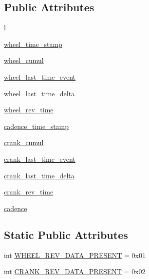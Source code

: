 \subsection*{Public Attributes}
\begin{DoxyCompactItemize}
\item 
\hyperlink{classble__sc_1_1CSC__Delegate_af237ae7177e1dba023617ab7c68f103a}{l}
\item 
\hyperlink{classble__sc_1_1CSC__Delegate_a4bd2c809d7123ec3b4d24510a7c29995}{wheel\+\_\+time\+\_\+stamp}
\item 
\hyperlink{classble__sc_1_1CSC__Delegate_a6cf7441d1a9f64d4589f264969dbba31}{wheel\+\_\+cumul}
\item 
\hyperlink{classble__sc_1_1CSC__Delegate_ab3d37c1828f03c4deb67a42294576718}{wheel\+\_\+last\+\_\+time\+\_\+event}
\item 
\hyperlink{classble__sc_1_1CSC__Delegate_ab0615eadb968070c25825660225c8230}{wheel\+\_\+last\+\_\+time\+\_\+delta}
\item 
\hyperlink{classble__sc_1_1CSC__Delegate_a9dbf98de41a570429328322ba71c351c}{wheel\+\_\+rev\+\_\+time}
\item 
\hyperlink{classble__sc_1_1CSC__Delegate_a1a9a94381e98c2b570ef10ba08088310}{cadence\+\_\+time\+\_\+stamp}
\item 
\hyperlink{classble__sc_1_1CSC__Delegate_a848195bccd1c79f19252061c5bf78864}{crank\+\_\+cumul}
\item 
\hyperlink{classble__sc_1_1CSC__Delegate_ad0e8adcc1155c16cb1be6c06484ed81b}{crank\+\_\+last\+\_\+time\+\_\+event}
\item 
\hyperlink{classble__sc_1_1CSC__Delegate_a12c08f59680dafbf3bb4f195e869230a}{crank\+\_\+last\+\_\+time\+\_\+delta}
\item 
\hyperlink{classble__sc_1_1CSC__Delegate_afff8a85491dfa34563af524d349c6828}{crank\+\_\+rev\+\_\+time}
\item 
\hyperlink{classble__sc_1_1CSC__Delegate_aa1160185d046f02b63558e5ffe4b8bad}{cadence}
\end{DoxyCompactItemize}
\subsection*{Static Public Attributes}
\begin{DoxyCompactItemize}
\item 
int \hyperlink{classble__sc_1_1CSC__Delegate_ac635e545ea7af14713237553b0096211}{W\+H\+E\+E\+L\+\_\+\+R\+E\+V\+\_\+\+D\+A\+T\+A\+\_\+\+P\+R\+E\+S\+E\+NT} = 0x01
\item 
int \hyperlink{classble__sc_1_1CSC__Delegate_abdfb5d122283851cd8efd460209dacde}{C\+R\+A\+N\+K\+\_\+\+R\+E\+V\+\_\+\+D\+A\+T\+A\+\_\+\+P\+R\+E\+S\+E\+NT} = 0x02
\end{DoxyCompactItemize}


